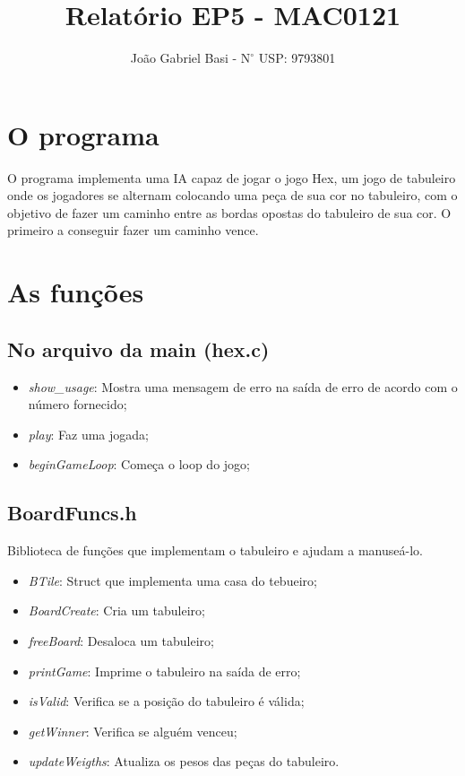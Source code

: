 \documentclass[12pt, a4paper]{article} %
\title{Relatório EP5 - MAC0121}
\date{}
\author{João Gabriel Basi - $\text{N}^\circ$ USP: 9793801}
\begin{document}
\maketitle
\section{O programa}
O programa implementa uma IA capaz de jogar o jogo Hex, um jogo de tabuleiro onde os jogadores se alternam colocando uma peça de sua cor no tabuleiro, com o objetivo de fazer um caminho entre as bordas opostas do tabuleiro de sua cor. O primeiro a conseguir fazer um caminho vence.

\section{As funções}
	\subsection{No arquivo da main (hex.c)}
	\begin{itemize}
		\item \textit{show\_usage}: Mostra uma mensagem de erro na saída de erro de acordo com o número fornecido;
		\item \textit{play}: Faz uma jogada;
		\item \textit{beginGameLoop}: Começa o loop do jogo;
	\end{itemize}
	\subsection{BoardFuncs.h}
	Biblioteca de funções que implementam o tabuleiro e ajudam a manuseá-lo.
	\begin{itemize}
		\item \textit{BTile}: Struct que implementa uma casa do tebueiro;
		\item \textit{BoardCreate}: Cria um tabuleiro;
		\item \textit{freeBoard}: Desaloca um tabuleiro;
		\item \textit{printGame}: Imprime o tabuleiro na saída de erro;
		\item \textit{isValid}: Verifica se a posição do tabuleiro é válida;
		\item \textit{getWinner}: Verifica se alguém venceu;
		\item \textit{updateWeigths}: Atualiza os pesos das peças do tabuleiro.
	\end{itemize}
\end{document}
